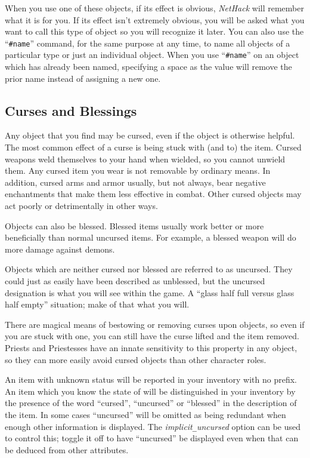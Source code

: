 When you use one of these objects, if its effect is obvious, {\it NetHack\/}
will remember what it is for you.  If its effect isn't extremely
obvious, you will be asked what you want to call this type of object
so you will recognize it later.  You can also use the ``{\tt \#name}''
command, for the same purpose at any time, to name
all objects of a particular type or just an individual object.
When you use ``{\tt \#name}'' on an object which has already been named,
specifying a space as the value will remove the prior name instead
of assigning a new one.

\subsection*{Curses and Blessings}

Any object that you find may be cursed, even if the object is
otherwise helpful.  The most common effect of a curse is being stuck
with (and to) the item.  Cursed weapons weld themselves to your hand
when wielded, so you cannot unwield them.  Any cursed item you wear
is not removable by ordinary means.  In addition, cursed arms and armor
usually, but not always, bear negative enchantments that make them
less effective in combat.  Other cursed objects may act poorly or
detrimentally in other ways.

Objects can also be blessed.  Blessed items usually work better or
more beneficially than normal uncursed items.  For example, a blessed
weapon will do more damage against demons.

Objects which are neither cursed nor blessed are referred to as uncursed.
They could just as easily have been described as unblessed, but the
uncursed designation is what you will see within the game.  A ``glass
half full versus glass half empty'' situation; make of that what you will.

There are magical means of bestowing or removing curses upon objects,
so even if you are stuck with one, you can still have the curse
lifted and the item removed.  Priests and Priestesses have an innate
sensitivity to this property in any object, so they can more easily avoid
cursed objects than other character roles.

An item with unknown status will be reported in your inventory with no prefix.
An item which you know the state of will be distinguished in your inventory
by the presence of the word ``cursed'', ``uncursed'' or ``blessed'' in the
description of the item.
In some cases ``uncursed'' will be omitted as being redundant when
enough other information is displayed.
The
{\it implicit\verb+_+uncursed\/}
option can be used to control this; toggle it off to have ``uncursed''
be displayed even when that can be deduced from other attributes.

